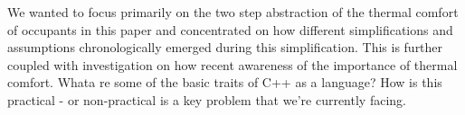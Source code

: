 We wanted to focus primarily on the two step abstraction of the thermal comfort of occupants in this paper and concentrated on how different simplifications and assumptions chronologically emerged during this simplification. This is further coupled with investigation on how recent awareness of the importance of thermal comfort. Whata re some of the basic traits of C++ as a language? How is this practical - or non-practical is a key problem that we're currently facing. 
